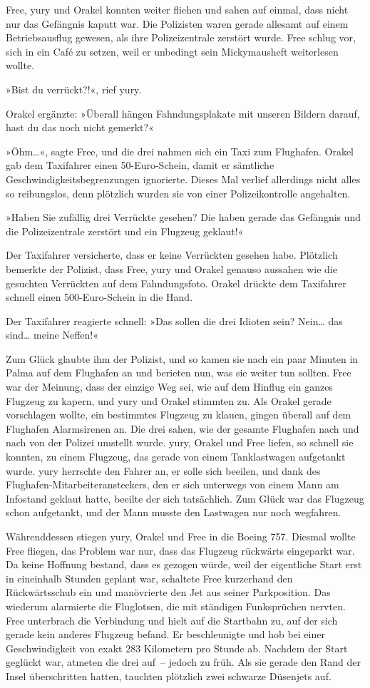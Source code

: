 Free, yury und Orakel konnten weiter fliehen und sahen auf einmal, dass nicht nur das Gefängnis kaputt war. Die Polizisten waren gerade allesamt auf einem Betriebsausflug gewesen, als ihre Polizeizentrale zerstört wurde. Free schlug vor, sich in ein Café zu setzen, weil er unbedingt sein Mickymausheft weiterlesen wollte.

»Bist du verrückt?!«, rief yury.

Orakel ergänzte: »Überall hängen Fahndungsplakate mit unseren Bildern darauf, hast du das noch nicht gemerkt?«

»Öhm…«, sagte Free, und die drei nahmen sich ein Taxi zum Flughafen. Orakel gab dem Taxifahrer einen 50-Euro-Schein, damit er sämtliche Geschwindigkeitsbegrenzungen ignorierte. Dieses Mal verlief allerdings nicht alles so reibungslos, denn plötzlich wurden sie von einer Polizeikontrolle angehalten.

»Haben Sie zufällig drei Verrückte gesehen? Die haben gerade das Gefängnis und die Polizeizentrale zerstört und ein Flugzeug geklaut!«

Der Taxifahrer versicherte, dass er keine Verrückten gesehen habe. Plötzlich bemerkte der Polizist, dass Free, yury und Orakel genauso aussahen wie die gesuchten Verrückten auf dem Fahndungsfoto. Orakel drückte dem Taxifahrer schnell einen 500-Euro-Schein in die Hand.

Der Taxifahrer reagierte schnell: »Das sollen die drei Idioten sein? Nein… das sind… meine Neffen!«

Zum Glück glaubte ihm der Polizist, und so kamen sie nach ein paar Minuten in Palma auf dem Flughafen an und berieten nun, was sie weiter tun sollten. Free war der Meinung, dass der einzige Weg sei, wie auf dem Hinflug ein ganzes Flugzeug zu kapern, und yury und Orakel stimmten zu. Als Orakel gerade vorschlagen wollte, ein bestimmtes Flugzeug zu klauen, gingen überall auf dem Flughafen Alarmsirenen an. Die drei sahen, wie der gesamte Flughafen nach und nach von der Polizei umstellt wurde. yury, Orakel und Free liefen, so schnell sie konnten, zu einem Flugzeug, das gerade von einem Tanklastwagen aufgetankt wurde. yury herrschte den Fahrer an, er solle sich beeilen, und dank des Flughafen-Mitarbeiteransteckers, den er sich unterwegs von einem Mann am Infostand geklaut hatte, beeilte der sich tatsächlich. Zum Glück war das Flugzeug schon aufgetankt, und der Mann musste den Lastwagen nur noch wegfahren.

Währenddessen stiegen yury, Orakel und Free in die Boeing 757. Diesmal wollte Free fliegen, das Problem war nur, dass das Flugzeug rückwärts eingeparkt war. Da keine Hoffnung bestand, dass es gezogen würde, weil der eigentliche Start erst in eineinhalb Stunden geplant war, schaltete Free kurzerhand den Rückwärtsschub ein und manövrierte den Jet aus seiner Parkposition. Das wiederum alarmierte die Fluglotsen, die mit ständigen Funksprüchen nervten. Free unterbrach die Verbindung und hielt auf die Startbahn zu, auf der sich gerade kein anderes Flugzeug befand. Er beschleunigte und hob bei einer Geschwindigkeit von exakt 283 Kilometern pro Stunde ab. Nachdem der Start geglückt war, atmeten die drei auf~– jedoch zu früh. Als sie gerade den Rand der Insel überschritten hatten, tauchten plötzlich zwei schwarze Düsenjets auf.


